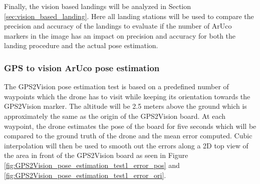 \documentclass[../Head/report.tex]{subfiles}
\begin{document}
Finally, the vision based landings will be analyzed in Section \ref{sec:vision_based_landing}. Here all landing stations will be used to compare the precision and accuracy of the landings to evaluate if the number of ArUco markers in the image has an impact on precision and accuracy for both the landing procedure and the actual pose estimation.

\subsubsection{GPS to vision ArUco pose estimation}
\label{sec:GPS2Vision_pose_estimation}

The GPS2Vision pose estimation test is based on a predefined number of waypoints which the drone has to visit while keeping its orientation towards the GPS2Vision marker. The altitude will be 2.5 meters above the ground which is approximately the same as the origin of the GPS2Vision board. At each waypoint, the drone estimates the pose of the board for five seconds which will be compared to the ground truth of the drone and the mean error computed. Cubic interpolation will then be used to smooth out the errors along a 2D top view of the area in front of the GPS2Vision board as seen in Figure \ref{fig:GPS2Vision_pose_estimation_test1_error_pos} and \ref{fig:GPS2Vision_pose_estimation_test1_error_ori}. 
\end{document}
